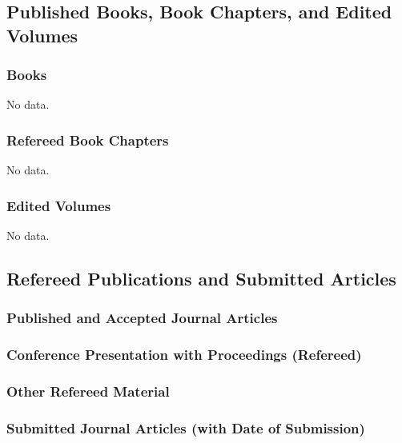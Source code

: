 \begin{adjustwidth}{2em}{0pt}

\subsection{Published Books, Book Chapters, and Edited Volumes}

\subsubsection{Books}
No data.

\subsubsection{Refereed Book Chapters}
No data.

\subsubsection{Edited Volumes}
No data.

\subsection{Refereed Publications and Submitted Articles}

\nocite{*}

\subsubsection{Published and Accepted Journal Articles}

\newrefcontext[labelprefix=J]
\printbibliography[type=article,resetnumbers=true,heading=none]

\subsubsection{Conference Presentation with Proceedings (Refereed)}

\newrefcontext[labelprefix=P]
\printbibliography[type=inproceedings,resetnumbers=true,heading=none]

\subsubsection{Other Refereed Material}

\newrefcontext[labelprefix=O]
\printbibliography[resetnumbers=true,filter=other,heading=none]

\subsubsection{Submitted Journal Articles (with Date of Submission)}
\newrefcontext[labelprefix=U]
\printbibliography[type=unpublished,resetnumbers=true,heading=none]


\end{adjustwidth}

